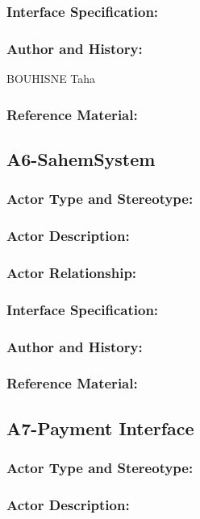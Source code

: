 \documentclass[11pt, openany]{report}
\begin{document}
\subsubsection{Interface Specification:}
\subsubsection{Author and History:}BOUHISNE Taha
\subsubsection{Reference Material:}
\subsection{A6-SahemSystem}
\label{A6}
\subsubsection{Actor Type and Stereotype:}
\subsubsection{Actor Description:}

\subsubsection{Actor Relationship:}
\subsubsection{Interface Specification:}
\subsubsection{Author and History:}
\subsubsection{Reference Material:}

\clearpage
\subsection{A7-Payment Interface}
\label{A7}
\subsubsection{Actor Type and Stereotype:}
\subsubsection{Actor Description:}
\end{document}
